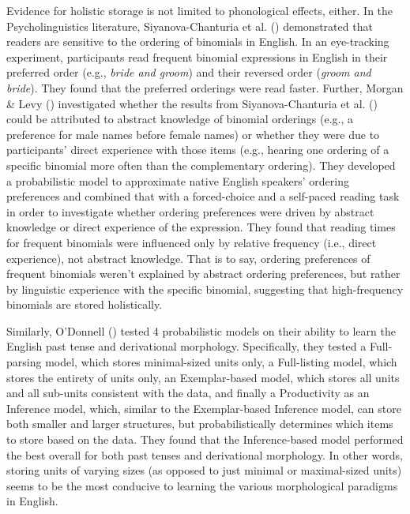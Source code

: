 \documentclass[
  12pt,
  letterpaper,
]{scrreport}
\begin{document}
Evidence for holistic storage is not limited to phonological effects,
either. In the Psycholinguistics literature, Siyanova-Chanturia et al.
()
demonstrated that readers are sensitive to the ordering of binomials in
English. In an eye-tracking experiment, participants read frequent
binomial expressions in English in their preferred order (e.g.,
\emph{bride and groom}) and their reversed order (\emph{groom and
bride}). They found that the preferred orderings were read faster.
Further, Morgan \& Levy
() investigated
whether the results from Siyanova-Chanturia et al.
() could be
attributed to abstract knowledge of binomial orderings (e.g., a
preference for male names before female names) or whether they were due
to participants' direct experience with those items (e.g., hearing one
ordering of a specific binomial more often than the complementary
ordering). They developed a probabilistic model to approximate native
English speakers' ordering preferences and combined that with a
forced-choice and a self-paced reading task in order to investigate
whether ordering preferences were driven by abstract knowledge or direct
experience of the expression. They found that reading times for frequent
binomials were influenced only by relative frequency (i.e., direct
experience), not abstract knowledge. That is to say, ordering
preferences of frequent binomials weren't explained by abstract ordering
preferences, but rather by linguistic experience with the specific
binomial, suggesting that high-frequency binomials are stored
holistically.

Similarly, O'Donnell
() tested 4
probabilistic models on their ability to learn the English past tense
and derivational morphology. Specifically, they tested a Full-parsing
model, which stores minimal-sized units only, a Full-listing model,
which stores the entirety of units only, an Exemplar-based model, which
stores all units and all sub-units consistent with the data, and finally
a Productivity as an Inference model, which, similar to the
Exemplar-based Inference model, can store both smaller and larger
structures, but probabilistically determines which items to store based
on the data. They found that the Inference-based model performed the
best overall for both past tenses and derivational morphology. In other
words, storing units of varying sizes (as opposed to just minimal or
maximal-sized units) seems to be the most conducive to learning the
various morphological paradigms in English.
\end{document}
